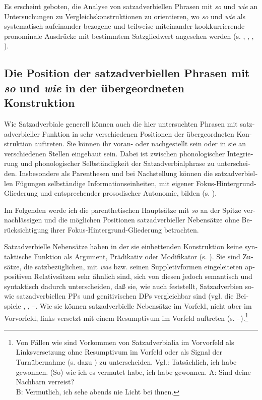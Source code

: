 \documentclass[output=paper, colorlinks, citecolor=brown, booklanguage=german]{langscibook}
\begin{document}
\begin{otherlanguage}{german}
Es erscheint geboten, die Analyse von satzadverbiellen Phrasen mit \textit{so} und \textit{wie} an Untersuchungen zu Vergleichskonstruktionen zu orientieren, wo \textit{so} und \textit{wie} als systematisch aufeinander bezogene und teilweise miteinander kookkurrierende pronominale Ausdrücke mit bestimmtem Satzgliedwert angesehen werden (s. \citealt{bierwisch1987semantikgraduierung}, \citealt{zimmermann1987zursyntaxvonkomparationskonstruktionen}, \citealt{zimmermann1992derskopusvonmodifikatoren}, \citealt{zimmermann1995bausteine}).

\subsection{Die Position der satzadverbiellen Phrasen mit \textit{so} und \textit{wie} in der übergeordneten Konstruktion}\label{sec:zi97:2.3}

Wie Satzadverbiale generell können auch die hier untersuchten Phrasen mit satzadverbieller Funktion in sehr verschiedenen Positionen der übergeordneten Konstruktion auftreten. Sie können ihr voran- oder nachgestellt sein oder in sie an verschiedenen Stellen eingebaut sein. Dabei ist zwischen phonologischer Integrierung und phonologischer Selbständigkeit der Satzadverbialphrase zu unterscheiden. Insbesondere als Parenthesen und bei Nachstellung können die satzadverbiellen Fügungen selbständige Informationseinheiten, mit eigener Fokus\hyp Hintergrund\hyp Gliederung und entsprechender prosodischer Autonomie, bilden (s. \citealt{brandt1990weiterfuhrendenebensatze, brandt1994subordinationundparenthese, brandt1997zurpragmatiksatzadverbiellerwiephrasen}).

Im Folgenden werde ich die parenthetischen Hauptsätze mit \textit{so} an der Spitze vernachlässigen und die möglichen Positionen satzadverbieller Nebensätze ohne Berücksichtigung ihrer Fokus-Hintergrund-Gliederung betrachten.

Satzadverbielle Nebensätze haben in der sie einbettenden Konstruktion keine syntaktische Funktion als Argument, Prädikativ oder Modifikator (s. \citealt{sommerfeldt83}). Sie sind Zusätze, die satzbezüglichen, mit \textit{was} bzw. seinen Suppletivformen eingeleiteten appositiven Relativsätzen sehr ähnlich sind, sich von diesen jedoch semantisch und syntaktisch dadurch unterscheiden, daß sie, wie auch \citet[26, 31]{hetland1992satzadverbienimfokus} feststellt, Satzadverbien sowie satzadverbiellen PPs und genitivischen DPs vergleichbar sind (vgl. die Beispiele , , --. Wie sie können satzadverbielle Nebensätze im Vorfeld, nicht aber im Vorvorfeld, links versetzt mit einem Resumptivum im Vorfeld auftreten (s. --).\footnote{Von Fällen wie  sind Vorkommen von Satzadverbialia im Vorvorfeld als Linksversetzung ohne Resumptivum im Vorfeld oder als Signal der Turnübernahme (s. dazu \citealt{kraft1996adverbialezwischensatzen}) zu unterscheiden. Vgl.: \ea Tatsächlich, ich habe gewonnen. \ex (So) wie ich es vermutet habe, ich habe gewonnen. \ex A: Sind deine Nachbarn verreist? \\ B: Vermutlich, ich sehe abends nie Licht bei ihnen. \z}


\end{otherlanguage}
\end{document}

